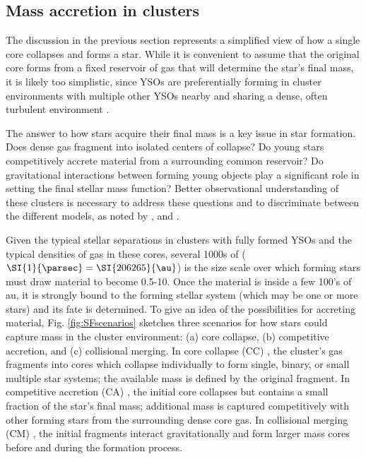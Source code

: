 \subsection{Mass accretion in clusters}

The discussion in the previous section represents a simplified view of how a single core collapses and forms a star. While it is convenient to assume that the original core forms from a fixed reservoir of gas that will determine the star's final mass, it is likely too simplistic, since YSOs are preferentially forming in cluster environments with  multiple other YSOs nearby and sharing a dense, often turbulent environment \citep{Porras:2003kxa,Allen:2007wqa,Gutermuth:2009gca}. 


The answer to how stars acquire their final mass is a key issue in star formation. Does dense gas fragment into isolated centers of collapse? Do young stars competitively accrete material from a surrounding common reservoir? Do gravitational interactions between forming young objects play a significant role in setting the final stellar mass function? Better observational understanding of these clusters is necessary to address these questions and to discriminate between the different models, as noted by \citet{Bonnell:2006ee}, \citet{Offner:2011ex} and \citet{Myers:2011fy}.

Given the typical stellar separations in clusters with fully formed YSOs and the typical densities of gas in these cores, several \num{1000}s of \si{\au} ($\SI{1}{\parsec} = \SI{206265}{\au} $) is the size scale over which forming stars must draw material to become 0.5-\SI{10}{\Msun}. Once the material is inside a few 100's of \si{au}, it is strongly bound to the forming stellar system (which may be one or more stars) and its fate is determined. To give an idea of the possibilities for accreting material, Fig. \ref{fig:SFscenarios} sketches three scenarios for how stars could capture mass in the cluster environment: (a) core collapse, (b) competitive accretion, and (c) collisional merging. In core collapse (CC) \citep[Fig.~\ref{subfig:scenarios:a},][]{McKee:2003gxa, Myers:2011fy}, the cluster's gas fragments into cores which collapse individually to form single, binary, or small multiple star systems; the available mass is defined by the original fragment. In competitive accretion (CA) \citep[Fig.~\ref{subfig:scenarios:b},][]{Bonnell:1997vta}, the initial core collapses but contains a small fraction of the star's final mass; additional mass is captured competitively with other forming stars from the surrounding dense core gas. In collisional merging (CM) \citep[Fig.~\ref{subfig:scenarios:c},][]{Bonnell:2002et}, the initial fragments interact gravitationally and form larger mass cores before and during the formation process. 

